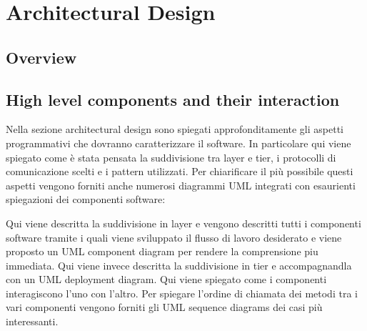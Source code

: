 \section{Architectural Design}
\subsection{Overview}
\subsection{High level components and their interaction}
Nella sezione architectural design sono spiegati approfonditamente gli aspetti programmativi che dovranno caratterizzare il software. 
In particolare qui viene spiegato come è stata pensata la suddivisione tra layer e tier, i protocolli di comunicazione scelti e i pattern utilizzati. 
Per chiarificare il più possibile questi aspetti vengono forniti anche numerosi diagrammi UML integrati con esaurienti spiegazioni dei componenti software: 
\begin{itemize}
	 Qui viene descritta la suddivisione in layer e vengono descritti tutti i componenti software tramite i quali viene sviluppato il flusso di lavoro desiderato e viene proposto un UML component diagram per rendere la comprensione piu immediata.
	 Qui viene invece descritta la suddivisione in tier e accompagnandla con un UML deployment diagram.
	 Qui viene spiegato come i componenti interagiscono l'uno con l'altro. Per spiegare l'ordine di chiamata dei metodi tra i vari componenti vengono forniti gli UML sequence diagrams dei casi più interessanti.
\end{itemize}
